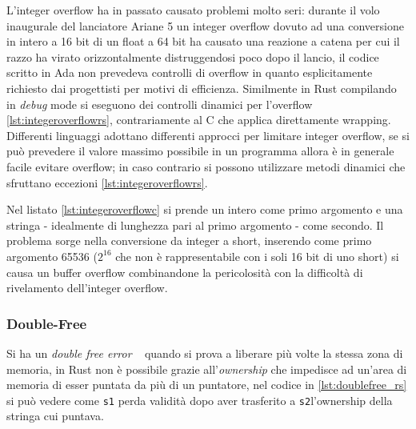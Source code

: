 \documentclass{article}
\begin{document}
L'integer overflow ha in passato causato problemi molto seri: durante il volo inaugurale del lanciatore Ariane 5 un integer overflow dovuto ad una conversione in intero a 16 bit di un float a 64 bit ha causato una reazione a catena per cui il razzo ha virato orizzontalmente distruggendosi poco dopo il lancio, il codice scritto in Ada non prevedeva controlli di overflow in quanto esplicitamente richiesto dai progettisti per motivi di efficienza. Similmente in Rust compilando in \textit{debug} mode si eseguono dei controlli dinamici per l'overflow \ref{lst:integeroverflowrs}, contrariamente al C che applica direttamente wrapping. \\
Differenti linguaggi adottano differenti approcci per limitare integer overflow, se si può prevedere il valore massimo possibile in un programma allora è in generale facile evitare overflow; in caso contrario si possono utilizzare metodi dinamici che sfruttano eccezioni \ref{lst:integeroverflowrs}. 




Nel listato \ref{lst:integeroverflowc} si prende un intero come primo argomento e una stringa - idealmente di lunghezza pari al primo argomento - come secondo. Il problema sorge nella conversione da integer a short, inserendo come primo argomento 65536 ($2^{16}$ che non è rappresentabile con i soli 16 bit di uno short) si causa un buffer overflow combinandone la pericolosità con la difficoltà di rivelamento dell'integer overflow.




\subsubsection{Double-Free} 
Si ha un \textit{double free error} ~\cite[10.4.4]{gollmann:computersecurity} quando si prova a liberare più volte la stessa zona di memoria, in Rust non è possibile grazie all'\textit{ownership} che impedisce ad un'area di memoria di esser puntata da più di un puntatore, nel codice in \ref{lst:doublefree_rs} si può vedere come \texttt{s1} perda validità dopo aver trasferito a \texttt{s2}l'ownership della stringa cui puntava.



\end{document}
